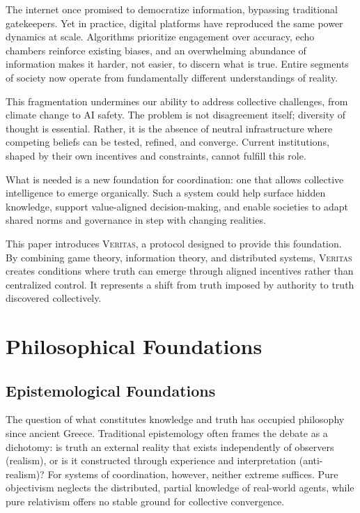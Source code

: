 \documentclass[11pt,a4paper]{article}
\newcommand{\veritas}{\textsc{Veritas}}
\begin{document}
The internet once promised to democratize information, bypassing traditional gatekeepers. Yet in practice, digital platforms have reproduced the same power dynamics at scale. Algorithms prioritize engagement over accuracy, echo chambers reinforce existing biases, and an overwhelming abundance of information makes it harder, not easier, to discern what is true. Entire segments of society now operate from fundamentally different understandings of reality.

This fragmentation undermines our ability to address collective challenges, from climate change to AI safety. The problem is not disagreement itself; diversity of thought is essential. Rather, it is the absence of neutral infrastructure where competing beliefs can be tested, refined, and converge. Current institutions, shaped by their own incentives and constraints, cannot fulfill this role.

What is needed is a new foundation for coordination: one that allows collective intelligence to emerge organically. Such a system could help surface hidden knowledge, support value-aligned decision-making, and enable societies to adapt shared norms and governance in step with changing realities.

This paper introduces \veritas{}, a protocol designed to provide this foundation. By combining game theory, information theory, and distributed systems, \veritas{} creates conditions where truth can emerge through aligned incentives rather than centralized control. It represents a shift from truth imposed by authority to truth discovered collectively.

\section{Philosophical Foundations}
\label{sec:philosophy}

\subsection{Epistemological Foundations}

The question of what constitutes knowledge and truth has occupied philosophy since ancient Greece. Traditional epistemology often frames the debate as a dichotomy: is truth an external reality that exists independently of observers (realism), or is it constructed through experience and interpretation (anti-realism)? For systems of coordination, however, neither extreme suffices. Pure objectivism neglects the distributed, partial knowledge of real-world agents, while pure relativism offers no stable ground for collective convergence.
\end{document}
